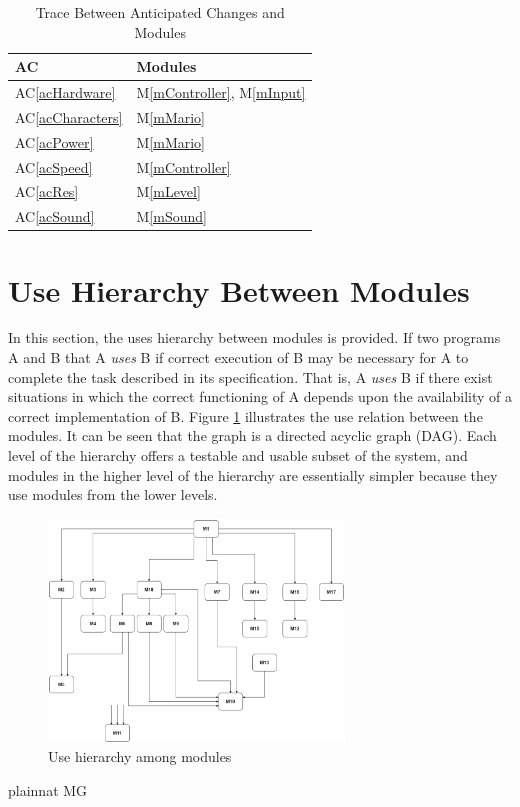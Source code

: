 \documentclass[12pt, titlepage]{article}
\newcommand{\acref}[1]{AC\ref{#1}}
\newcommand{\mref}[1]{M\ref{#1}}
\begin{document}
\begin{table}[H]
\centering
\begin{tabular}{p{} p{}}
\toprule
\textbf{AC} & \textbf{Modules}\\
\midrule
\acref{acHardware} & \mref{mController}, \mref{mInput}\\
\acref{acCharacters} & \mref{mMario}\\
\acref{acPower} & \mref{mMario}\\
\acref{acSpeed} & \mref{mController}\\
\acref{acRes} & \mref{mLevel}\\
\acref{acSound} & \mref{mSound}\\

\bottomrule
\end{tabular}
\caption{Trace Between Anticipated Changes and Modules}
\label{TblACT}
\end{table}

\section{Use Hierarchy Between Modules} \label{SecUse}

In this section, the uses hierarchy between modules is
provided. If two programs A and B that A {\em uses} B if
correct execution of B may be necessary for A to complete the task described in
its specification. That is, A {\em uses} B if there exist situations in which
the correct functioning of A depends upon the availability of a correct
implementation of B.  Figure \ref{FigUH} illustrates the use relation between
the modules. It can be seen that the graph is a directed acyclic graph
(DAG). Each level of the hierarchy offers a testable and usable subset of the
system, and modules in the higher level of the hierarchy are essentially simpler
because they use modules from the lower levels.

\begin{figure}[H]
\centering
\includegraphics[width=0.7\textwidth]{UsesHierarchy.png}
\caption{Use hierarchy among modules}
\label{FigUH}
\end{figure}


 {plainnat}
 {MG}
\end{document}
